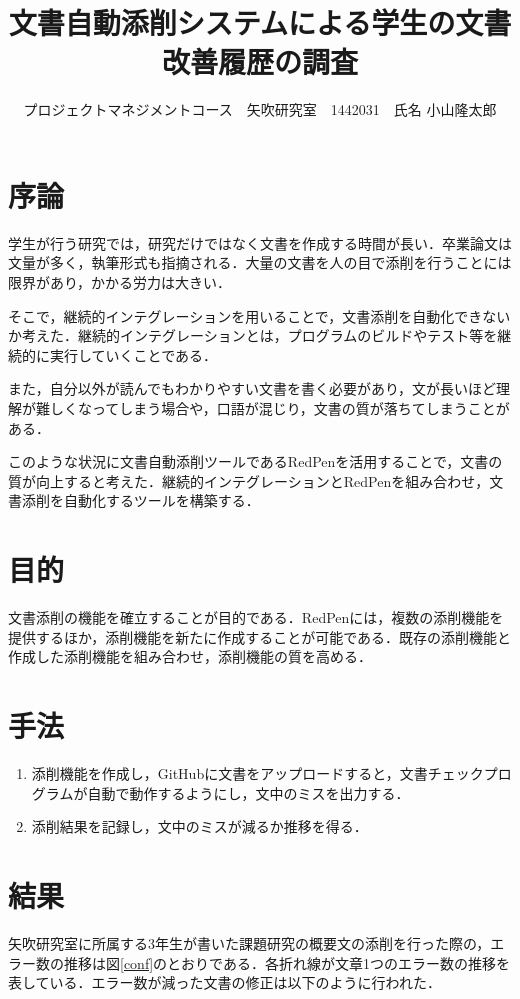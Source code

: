 \documentclass[uplatex,twocolumn,dvipdfmx]{jsarticle}
\title{\vspace{-5mm}\fontsize{14pt}{0pt}\selectfont 文書自動添削システムによる学生の文書改善履歴の調査}
\author{\normalsize プロジェクトマネジメントコース　矢吹研究室　1442031　氏名 小山隆太郎}
\date{}
\begin{document}
\fontsize{10.5pt}{\baselineskip}\selectfont
\maketitle





\section{序論}
学生が行う研究では，研究だけではなく文書を作成する時間が長い．卒業論文は文量が多く，執筆形式も指摘される．大量の文書を人の目で添削を行うことには限界があり，かかる労力は大きい．

そこで，継続的インテグレーション\cite{a}を用いることで，文書添削を自動化できないか考えた．継続的インテグレーションとは，プログラムのビルドやテスト等を継続的に実行していくことである．

また，自分以外が読んでもわかりやすい文書を書く必要があり，文が長いほど理解が難しくなってしまう場合や，口語が混じり，文書の質が落ちてしまうことがある．

このような状況に文書自動添削ツールであるRedPenを活用することで，文書の質が向上すると考えた．継続的インテグレーションとRedPenを組み合わせ，文書添削を自動化するツールを構築する．

\section{目的}
文書添削の機能を確立することが目的である．RedPenには，複数の添削機能を提供するほか，添削機能を新たに作成することが可能である．既存の添削機能と作成した添削機能を組み合わせ，添削機能の質を高める．

\section{手法}
\begin{enumerate}
\item 添削機能を作成し，GitHubに文書をアップロードすると，文書チェックプログラムが自動で動作するようにし，文中のミスを出力する． 
\item 添削結果を記録し，文中のミスが減るか推移を得る．
\end{enumerate}

\section{結果}
矢吹研究室に所属する3年生が書いた課題研究の概要文の添削を行った際の，エラー数の推移は図\ref{conf}のとおりである．各折れ線が文章1つのエラー数の推移を表している．エラー数が減った文書の修正は以下のように行われた．
\end{document}
